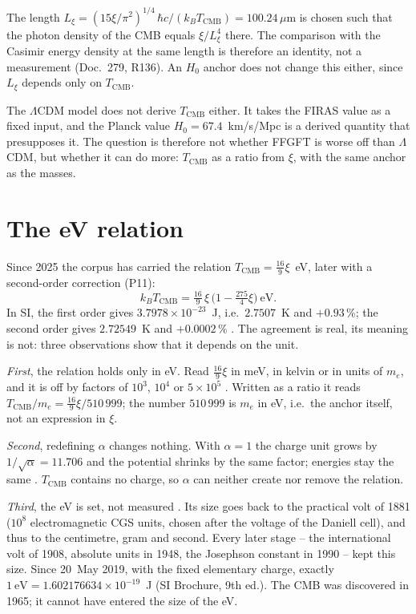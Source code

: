 The length $L_\xi=(15\xi/\pi^2)^{1/4}\,\hbar c/(k_BT_{\mathrm{CMB}})=100.24\,\mu$m is chosen such
that the photon density of the CMB equals $\xi/L_\xi^4$ there. The comparison with the Casimir
energy density at the same length is therefore an identity, not a measurement (Doc.~279, R136).
An $H_0$ anchor does not change this either, since $L_\xi$ depends only on $T_{\mathrm{CMB}}$.

The $\Lambda$CDM model does not derive $T_{\mathrm{CMB}}$ either. It takes the FIRAS value as a
fixed input, and the Planck value $H_0=67.4$~km/s/Mpc is a derived quantity that presupposes it.
The question is therefore not whether FFGFT is worse off than $\Lambda$CDM, but whether it can do
more: $T_{\mathrm{CMB}}$ as a ratio from $\xi$, with the same anchor as the masses.

\section{The eV relation}

Since 2025 the corpus has carried the relation $T_{\mathrm{CMB}}=\frac{16}{9}\xi$~eV, later with a
second-order correction (P11):
\begin{equation}
k_BT_{\mathrm{CMB}}=\tfrac{16}{9}\,\xi\,\bigl(1-\tfrac{275}{4}\xi\bigr)\ \mathrm{eV}.
\end{equation}
In SI, the first order gives $3.7978\times10^{-23}$~J, i.e.\ $2.7507$~K and $+0.93\,\%$; the
second order gives $2.72549$~K and $+0.0002\,\%$ \KM. The agreement is real, its meaning is not:
three observations show that it depends on the unit.

\emph{First}, the relation holds only in eV. Read $\frac{16}{9}\xi$ in meV, in kelvin or in units
of $m_e$, and it is off by factors of $10^3$, $10^4$ or $5\times10^5$ \KM. Written as a ratio it
reads $T_{\mathrm{CMB}}/m_e=\frac{16}{9}\xi/510\,999$; the number $510\,999$ is $m_e$ in eV, i.e.\
the anchor itself, not an expression in $\xi$.

\emph{Second}, redefining $\alpha$ changes nothing. With $\alpha=1$ the charge unit grows by
$1/\sqrt\alpha=11.706$ and the potential shrinks by the same factor; energies stay the same \BM.
$T_{\mathrm{CMB}}$ contains no charge, so $\alpha$ can neither create nor remove the relation.

\emph{Third}, the eV is set, not measured \QM. Its size goes back to the practical volt of 1881
($10^8$ electromagnetic CGS units, chosen after the voltage of the Daniell cell), and thus to the
centimetre, gram and second. Every later stage -- the international volt of 1908, absolute units
in 1948, the Josephson constant in 1990 -- kept this size. Since 20~May 2019, with the fixed
elementary charge, exactly $1\ \mathrm{eV}=1.602176634\times10^{-19}$~J (SI Brochure, 9th ed.).
The CMB was discovered in 1965; it cannot have entered the size of the eV.

